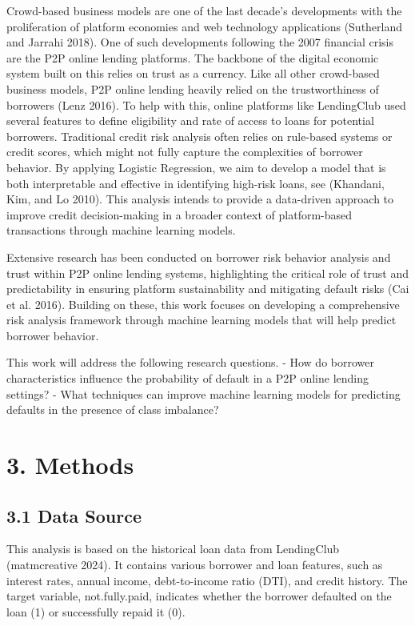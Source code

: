 \documentclass[
  letterpaper,
  DIV=11,
  numbers=noendperiod]{scrartcl}
\begin{document}
Crowd-based business models are one of the last decade's developments
with the proliferation of platform economies and web technology
applications (Sutherland and Jarrahi 2018). One of such developments
following the 2007 financial crisis are the P2P online lending
platforms. The backbone of the digital economic system built on this
relies on trust as a currency. Like all other crowd-based business
models, P2P online lending heavily relied on the trustworthiness of
borrowers (Lenz 2016). To help with this, online platforms like
LendingClub used several features to define eligibility and rate of
access to loans for potential borrowers. Traditional credit risk
analysis often relies on rule-based systems or credit scores, which
might not fully capture the complexities of borrower behavior. By
applying Logistic Regression, we aim to develop a model that is both
interpretable and effective in identifying high-risk loans, see
(Khandani, Kim, and Lo 2010). This analysis intends to provide a
data-driven approach to improve credit decision-making in a broader
context of platform-based transactions through machine learning models.

Extensive research has been conducted on borrower risk behavior analysis
and trust within P2P online lending systems, highlighting the critical
role of trust and predictability in ensuring platform sustainability and
mitigating default risks (Cai et al. 2016). Building on these, this work
focuses on developing a comprehensive risk analysis framework through
machine learning models that will help predict borrower behavior.

This work will address the following research questions. - How do
borrower characteristics influence the probability of default in a P2P
online lending settings? - What techniques can improve machine learning
models for predicting defaults in the presence of class imbalance?

\section{\texorpdfstring{3. Methods }{3. Methods  }}\label{methods}

\subsection{3.1 Data Source}\label{data-source}

This analysis is based on the historical loan data from LendingClub
(matmcreative 2024). It contains various borrower and loan features,
such as interest rates, annual income, debt-to-income ratio (DTI), and
credit history. The target variable, not.fully.paid, indicates whether
the borrower defaulted on the loan (1) or successfully repaid it (0).
\end{document}

